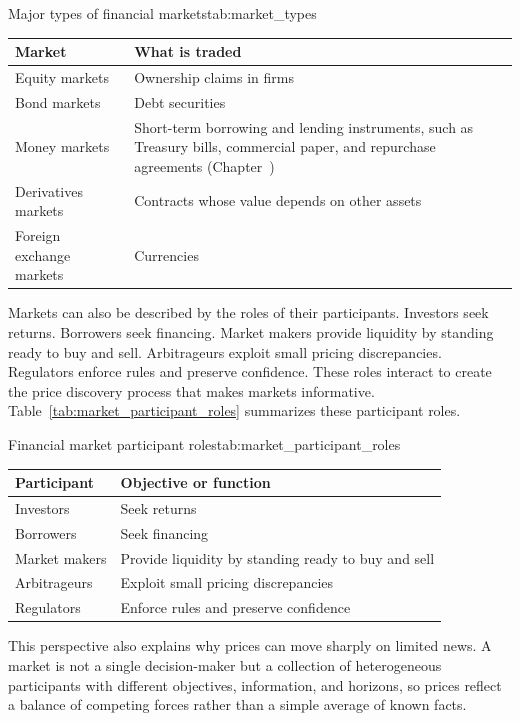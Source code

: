 \documentclass[../ai_in_finance]{subfiles}
\begin{document}
\begin{booktable}[htbp]{Major types of financial markets}{tab:market_types}
\begin{tabular}{L{4.0cm}L{8.0cm}}
\toprule
Market & What is traded \\
\midrule
Equity markets & Ownership claims in firms \\
Bond markets & Debt securities \\
Money markets & Short-term borrowing and lending instruments, such as Treasury bills, commercial paper, and repurchase agreements (Chapter~) \\
Derivatives markets & Contracts whose value depends on other assets \\
Foreign exchange markets & Currencies \\
\bottomrule
\end{tabular}
\end{booktable}

Markets can also be described by the roles of their participants. Investors seek returns. Borrowers seek financing. Market makers provide liquidity by standing ready to buy and sell. Arbitrageurs exploit small pricing discrepancies. Regulators enforce rules and preserve confidence. These roles interact to create the price discovery process that makes markets informative. Table~\ref{tab:market_participant_roles} summarizes these participant roles.

\begin{booktable}[htbp]{Financial market participant roles}{tab:market_participant_roles}
\begin{tabular}{L{4.0cm}L{8.0cm}}
\toprule
Participant & Objective or function \\
\midrule
Investors & Seek returns \\
Borrowers & Seek financing \\
Market makers & Provide liquidity by standing ready to buy and sell \\
Arbitrageurs & Exploit small pricing discrepancies \\
Regulators & Enforce rules and preserve confidence \\
\bottomrule
\end{tabular}
\end{booktable}

This perspective also explains why prices can move sharply on limited news. A market is not a single decision-maker but a collection of heterogeneous participants with different objectives, information, and horizons, so prices reflect a balance of competing forces rather than a simple average of known facts.
\end{document}
